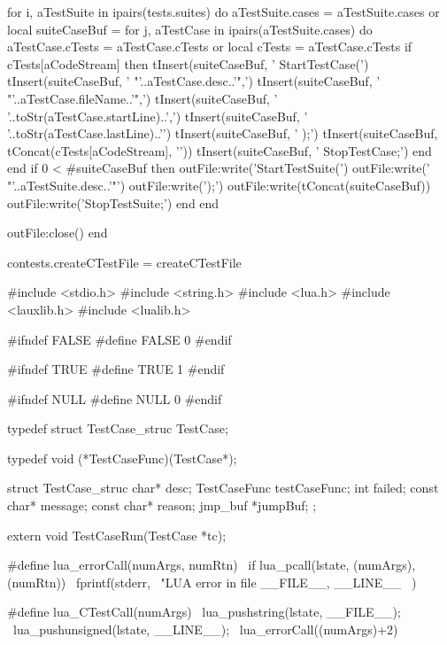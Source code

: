   for i, aTestSuite in ipairs(tests.suites) do
    aTestSuite.cases = aTestSuite.cases or { }
    local suiteCaseBuf = { }
    for j, aTestCase in ipairs(aTestSuite.cases) do
      aTestCase.cTests = aTestCase.cTests or { }
      local cTests     = aTestCase.cTests
      if cTests[aCodeStream] then
        tInsert(suiteCaseBuf, '  StartTestCase(\n')
        tInsert(suiteCaseBuf, '    "'..aTestCase.desc..'",\n')
        tInsert(suiteCaseBuf, '    "'..aTestCase.fileName..'",\n')
        tInsert(suiteCaseBuf, '    '..toStr(aTestCase.startLine)..',\n')
        tInsert(suiteCaseBuf, '    '..toStr(aTestCase.lastLine)..'\n')
        tInsert(suiteCaseBuf, '  );\n\n')
        tInsert(suiteCaseBuf, tConcat(cTests[aCodeStream], '\n\n'))
        tInsert(suiteCaseBuf, '  StopTestCase;\n\n')
      end
    end
    if 0 < #suiteCaseBuf then
      outFile:write('StartTestSuite(\n')
      outFile:write('  "'..aTestSuite.desc..'"\n')
      outFile:write(');\n\n')
      outFile:write(tConcat(suiteCaseBuf))
      outFile:write('StopTestSuite;\n\n')
    end
  end

  outFile:close()
end

contests.createCTestFile = createCTestFile
\stopLuaCode

\startCHeader
#include <stdio.h>
#include <string.h>
#include <lua.h>
#include <lauxlib.h>
#include <lualib.h>

#ifndef FALSE
#define FALSE 0
#endif

#ifndef TRUE
#define TRUE 1
#endif

#ifndef NULL
#define NULL 0
#endif

typedef struct TestCase_struc TestCase;

typedef void (*TestCaseFunc)(TestCase*);

struct TestCase_struc {
  char*         desc;
  TestCaseFunc  testCaseFunc;
  int           failed;
  const char*   message;
  const char*   reason;
  jmp_buf      *jumpBuf;
};

extern void TestCaseRun(TestCase *tc);

#define lua_errorCall(numArgs, numRtn)        \
  if lua_pcall(lstate, (numArgs), (numRtn)) { \
    fprintf(stderr,                           \
      "LUA error in file %
      __FILE__, __LINE__                      \
    )                                         \
  }
  
#define lua_CTestCall(numArgs)        \
  lua_pushstring(lstate, __FILE__);   \
  lua_pushunsigned(lstate, __LINE__); \
  lua_errorCall((numArgs)+2)


